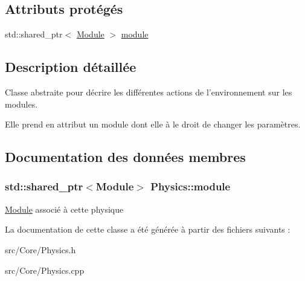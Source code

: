 \subsection*{Attributs protégés}
\begin{DoxyCompactItemize}
\item 
std\-::shared\-\_\-ptr$<$ \hyperlink{classModule}{Module} $>$ \hyperlink{classPhysics_a059d7b72c91f5964fc3e3f3d5a189e9d}{module}
\end{DoxyCompactItemize}


\subsection{Description détaillée}
Classe abstraite pour décrire les différentes actions de l'environnement sur les modules. 

Elle prend en attribut un module dont elle à le droit de changer les paramètres. 

\subsection{Documentation des données membres}
\hypertarget{classPhysics_a059d7b72c91f5964fc3e3f3d5a189e9d}{
\subsubsection[{module}]{\setlength{\rightskip}{0pt plus 5cm}std\-::shared\-\_\-ptr$<${\bf Module}$>$ Physics\-::module\hspace{0.3cm}{\ttfamily [protected]}}}\label{classPhysics_a059d7b72c91f5964fc3e3f3d5a189e9d}
\hyperlink{classModule}{Module} associé à cette physique 

La documentation de cette classe a été générée à partir des fichiers suivants \-:\begin{DoxyCompactItemize}
\item 
src/\-Core/Physics.\-h\item 
src/\-Core/Physics.\-cpp\end{DoxyCompactItemize}
